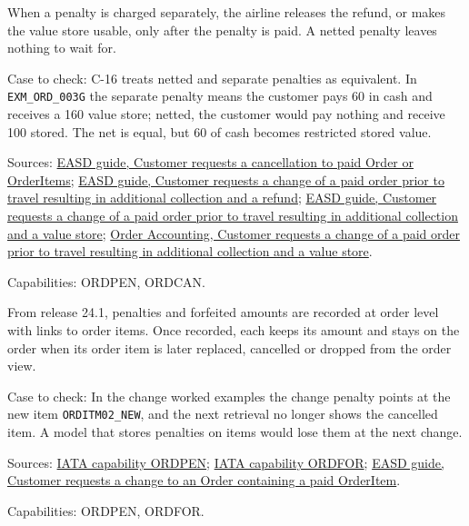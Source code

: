 \begin{theorem}
  \label{thm:change-cancellation-refund-after-penalty}
  When a penalty is charged separately, the airline releases the refund, or
  makes the value store usable, only after the penalty is paid. A netted
  penalty leaves nothing to wait for.

  Case to check: C-16 treats netted and separate penalties as equivalent. In
  \texttt{EXM\_ORD\_003G} the separate penalty means the customer pays 60 in
  cash and receives a 160 value store; netted, the customer would pay
  nothing and receive 100 stored. The net is equal, but 60 of cash becomes
  restricted stored value.

  Sources: \href{https://standards.atlassian.net/wiki/spaces/EASD/pages/817594369}{EASD guide, Customer requests a cancellation to paid Order or OrderItems};
  \href{https://standards.atlassian.net/wiki/spaces/EASD/pages/842301447}{EASD guide, Customer requests a change of a paid order prior to travel resulting in additional collection and a refund};
  \href{https://standards.atlassian.net/wiki/spaces/EASD/pages/842268712}{EASD guide, Customer requests a change of a paid order prior to travel resulting in additional collection and a value store};
  \href{https://standards.atlassian.net/wiki/spaces/OA/pages/844169238}{Order Accounting, Customer requests a change of a paid order prior to travel resulting in additional collection and a value store}.

  Capabilities: ORDPEN, ORDCAN.
\end{theorem}

\begin{theorem}
  \label{thm:change-cancellation-penalties-persist}
  From release 24.1, penalties and forfeited amounts are recorded at order
  level with links to order items. Once recorded, each keeps its amount and
  stays on the order when its order item is later replaced, cancelled or
  dropped from the order view.

  Case to check: In the change worked examples the change penalty points at
  the new item \texttt{ORDITM02\_NEW}, and the next retrieval no longer
  shows the cancelled item. A model that stores penalties on items would
  lose them at the next change.

  Sources: \href{https://retailing.iata.org/armi/docs/ORDPEN/}{IATA capability ORDPEN};
  \href{https://retailing.iata.org/armi/docs/ORDFOR/}{IATA capability ORDFOR};
  \href{https://standards.atlassian.net/wiki/spaces/EASD/pages/842268673}{EASD guide, Customer requests a change to an Order containing a paid OrderItem}.

  Capabilities: ORDPEN, ORDFOR.
\end{theorem}

